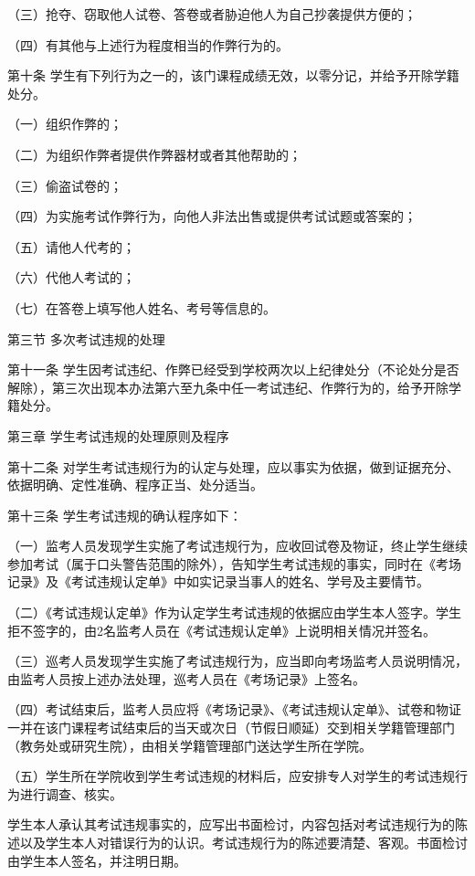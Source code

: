 \documentclass[UTF8,12pt,a4paper]{report}
\begin{document}
（三）抢夺、窃取他人试卷、答卷或者胁迫他人为自己抄袭提供方便的；

（四）有其他与上述行为程度相当的作弊行为的。

第十条  学生有下列行为之一的，该门课程成绩无效，以零分记，并给予开除学籍处分。

（一）组织作弊的；

（二）为组织作弊者提供作弊器材或者其他帮助的；

（三）偷盗试卷的；

（四）为实施考试作弊行为，向他人非法出售或提供考试试题或答案的；

（五）请他人代考的；

（六）代他人考试的；

（七）在答卷上填写他人姓名、考号等信息的。

第三节  多次考试违规的处理

第十一条  学生因考试违纪、作弊已经受到学校两次以上纪律处分（不论处分是否解除），第三次出现本办法第六至九条中任一考试违纪、作弊行为的，给予开除学籍处分。



第三章  学生考试违规的处理原则及程序

第十二条  对学生考试违规行为的认定与处理，应以事实为依据，做到证据充分、依据明确、定性准确、程序正当、处分适当。

第十三条  学生考试违规的确认程序如下：

（一）监考人员发现学生实施了考试违规行为，应收回试卷及物证，终止学生继续参加考试（属于口头警告范围的除外），告知学生考试违规的事实，同时在《考场记录》及《考试违规认定单》中如实记录当事人的姓名、学号及主要情节。

（二）《考试违规认定单》作为认定学生考试违规的依据应由学生本人签字。学生拒不签字的，由2名监考人员在《考试违规认定单》上说明相关情况并签名。

（三）巡考人员发现学生实施了考试违规行为，应当即向考场监考人员说明情况，由监考人员按上述办法处理，巡考人员在《考场记录》上签名。

（四）考试结束后，监考人员应将《考场记录》、《考试违规认定单》、试卷和物证一并在该门课程考试结束后的当天或次日（节假日顺延）交到相关学籍管理部门（教务处或研究生院），由相关学籍管理部门送达学生所在学院。

（五）学生所在学院收到学生考试违规的材料后，应安排专人对学生的考试违规行为进行调查、核实。

学生本人承认其考试违规事实的，应写出书面检讨，内容包括对考试违规行为的陈述以及学生本人对错误行为的认识。考试违规行为的陈述要清楚、客观。书面检讨由学生本人签名，并注明日期。
\end{document}
